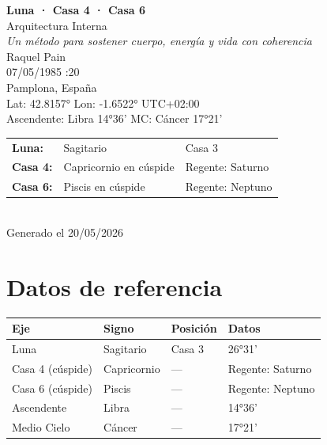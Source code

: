 \documentclass[11pt,a4paper]{article}
\begin{document}
\begin{titlepage}
  \centering
  \vspace*{1.5cm}
  {\Huge\bfseries\color{azulai} Luna · Casa 4 · Casa 6}\\[0.5cm]
  {\large\color{grisai} Arquitectura Interna}\\[0.3cm]
  {\small\itshape\color{grisai} Un método para sostener cuerpo, energía y vida con coherencia}\\[2cm]
  {\huge\color{doradoai} Raquel Pain}\\[1.5cm]
  {\Large 07/05/1985 :20}\\[0.3cm]
  {\Large Pamplona, España}\\[0.3cm]
  {\normalsize Lat: 42.8157° \quad Lon: -1.6522° \quad UTC+02:00}\\[0.3cm]
  {\normalsize Ascendente: Libra 14°36' \quad
    MC: Cáncer 17°21'}\\[2cm]

  \begin{tabular}{lll}
    \textbf{Luna:} & Sagitario & Casa 3 \\
    \textbf{Casa 4:} & Capricornio en cúspide & Regente: Saturno \\
    \textbf{Casa 6:} & Piscis en cúspide & Regente: Neptuno \\
  \end{tabular}\\[2cm]

  \vfill
  {\small Generado el 20/05/2026}
\end{titlepage}

\tableofcontents
\clearpage

\section{Datos de referencia}

\begin{center}
\begin{tabular}{llll}
  \toprule
  \textbf{Eje} & \textbf{Signo} & \textbf{Posición} & \textbf{Datos} \\
  \midrule
  Luna & Sagitario & Casa 3 & 26°31' \\
  Casa 4 (cúspide) & Capricornio & --- & Regente: Saturno \\
  Casa 6 (cúspide) & Piscis & --- & Regente: Neptuno \\
  Ascendente & Libra & --- & 14°36' \\
  Medio Cielo & Cáncer & --- & 17°21' \\
  \bottomrule
\end{tabular}
\end{center}
\end{document}
